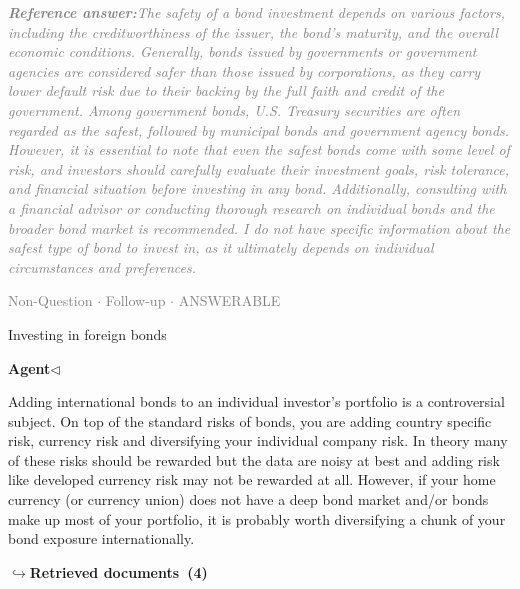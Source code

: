 \documentclass[a4paper,11pt]{article}
\begin{document}
\begin{refanswerenv}
{\footnotesize\textit{\textcolor{gray}{\textbf{Reference answer:}\enspace The safety of a bond investment depends on various factors, including the creditworthiness of the issuer, the bond's maturity, and the overall economic conditions. Generally, bonds issued by governments or government agencies are considered safer than those issued by corporations, as they carry lower default risk due to their backing by the full faith and credit of the government. Among government bonds, U.S. Treasury securities are often regarded as the safest, followed by municipal bonds and government agency bonds. However, it is essential to note that even the safest bonds come with some level of risk, and investors should carefully evaluate their investment goals, risk tolerance, and financial situation before investing in any bond. Additionally, consulting with a financial advisor or conducting thorough research on individual bonds and the broader bond market is recommended. I do not have specific information about the safest type of bond to invest in, as it ultimately depends on individual circumstances and preferences.}}}
\end{refanswerenv}
\vspace{0.5em}
\hfill{\tiny\textcolor{gray}{Non-Question $\cdot$ Follow-up $\cdot$ ANSWERABLE}}
\begin{userbubble}
Investing in foreign bonds
\end{userbubble}
\noindent\hfill{\small\textcolor{agentcolor}{\textbf{Agent\enspace$\triangleleft$}}}
\begin{agentbubble}
Adding international bonds to an individual investor's portfolio is a controversial subject. On top of the standard risks of bonds, you are adding country specific risk, currency risk and diversifying your individual company risk. In theory many of these risks should be rewarded but the data are noisy at best and adding risk like developed currency risk may not be rewarded at all.  However, if your home currency (or currency union) does not have a deep bond market and/or bonds make up most of your portfolio, it is probably worth diversifying a chunk of your bond exposure internationally.  
\end{agentbubble}
\noindent\hfill{\footnotesize\textcolor{doccolor}{\textbf{$\hookrightarrow$\enspace Retrieved documents~(4)}}}
\end{document}
